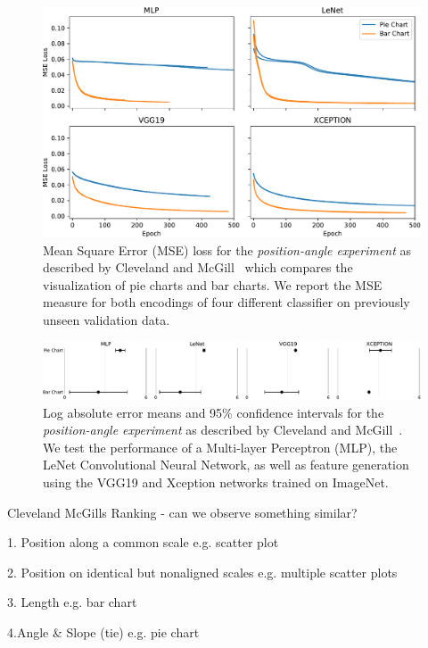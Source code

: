 \documentclass[journal]{vgtc}                %
\begin{document}
\begin{figure}[t]
	  \includegraphics[width=\linewidth]{figure3_val_loss.pdf}
  \caption{Mean Square Error (MSE) loss for the \emph{position-angle experiment} as described by Cleveland and McGill~\cite{cleveland_mcgill} which compares the visualization of pie charts and bar charts. We report the MSE measure for both encodings of four different classifier on previously unseen validation data.}
	\label{fig:position_angle_results}
\end{figure}

\begin{figure}[t]
	  \includegraphics[width=\linewidth]{figure3_mlae.pdf}
  \caption{Log absolute error means and 95\% confidence intervals for the \emph{position-angle experiment} as described by Cleveland and McGill~\cite{cleveland_mcgill}. We test the performance of a Multi-layer Perceptron (MLP), the LeNet Convolutional Neural Network, as well as feature generation using the VGG19 and Xception networks trained on ImageNet.}
	\label{fig:position_angle_results}
\end{figure}

Cleveland McGills Ranking - can we observe something similar?

1. Position along a common scale e.g. scatter plot

2. Position on identical but nonaligned scales e.g. multiple scatter plots

3. Length e.g. bar chart

4.Angle \& Slope (tie) e.g. pie chart
\end{document}
